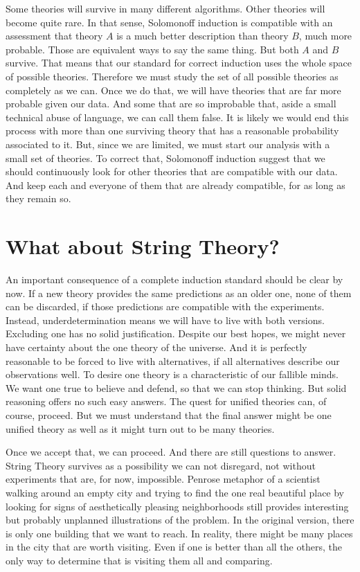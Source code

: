 \documentclass{article}
\begin{document}
	
	Some theories will survive in many different algorithms.  Other theories will become quite rare. In that sense, Solomonoff induction is compatible with an assessment that theory $A$ is a much better description than theory $B$, much more probable. Those are equivalent ways to say the same thing. But both $A$ and $B$ survive. That means that our standard for correct induction  uses the whole space of possible theories. Therefore we must study the set of all possible theories as completely as we can. Once we do that, we will have theories that are far more probable given our data. And some that are so improbable that, aside a small technical abuse of language, we can call them false. It is likely we would end this process with more than one surviving theory that has a reasonable probability associated to it. But, since we are limited, we must start our analysis with a small set of theories. To correct that, Solomonoff induction suggest that we should continuously look for other theories that are compatible with our data. And keep each and everyone of them that are already compatible, for as long as they remain so.
	
	
	
	\section{What about String Theory?}
	
	An important consequence of a complete induction standard should be clear by now. If a new theory provides the same predictions as an older one, none of them can be discarded, if those predictions are compatible with the experiments. Instead, underdetermination means we will have to live with both versions. Excluding one has no solid justification. Despite our best hopes, we might never have certainty about the one theory of the universe. And it is perfectly reasonable to be forced to live with alternatives, if all alternatives describe our observations well. To desire one theory is a characteristic of our fallible minds. We want one true to believe and defend, so that we can stop thinking. But solid reasoning offers no such easy answers. The quest for unified theories can, of course, proceed. But we must understand that the final answer might be one unified theory as well as it might turn out to be many theories.
	
	Once we accept that, we can proceed. And there are still questions to answer. String Theory survives as a possibility we can not disregard, not without experiments that are, for now, impossible. Penrose metaphor of a scientist walking around an empty city and trying to find the one real beautiful place by looking for signs of aesthetically pleasing neighborhoods \cite{penrose05a} still provides interesting but probably unplanned illustrations of the problem. In the original version, there is only one building that we want to reach. In reality, there might be many places in the city that are worth visiting. Even if one is better than all the others, the only way to determine that is visiting them all and comparing.
	
\end{document}
